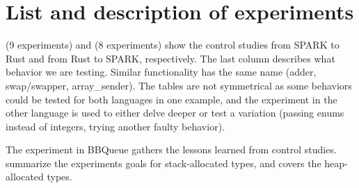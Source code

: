 \documentclass[nomenclature, english, bibtex]{kththesis}
\begin{document}
\section{List and description of experiments}
\label{tab:listexperiments}

 (9 experiments) and  (8 experiments) show the control studies from SPARK to Rust and from Rust to SPARK,
respectively. The last column describes what behavior we are testing. Similar functionality has the same name (adder, swap/swapper, array\_sender). The tables are not symmetrical as some behaviors could be tested for both languages in one example, and the experiment in the other language is used to either delve deeper or test a variation (passing enums instead of integers, trying another faulty behavior).

The experiment in BBQueue gathers the lessons learned from control studies.  summarize the experiments goals for stack-allocated types, and  covers the heap-allocated types.
\end{document}
